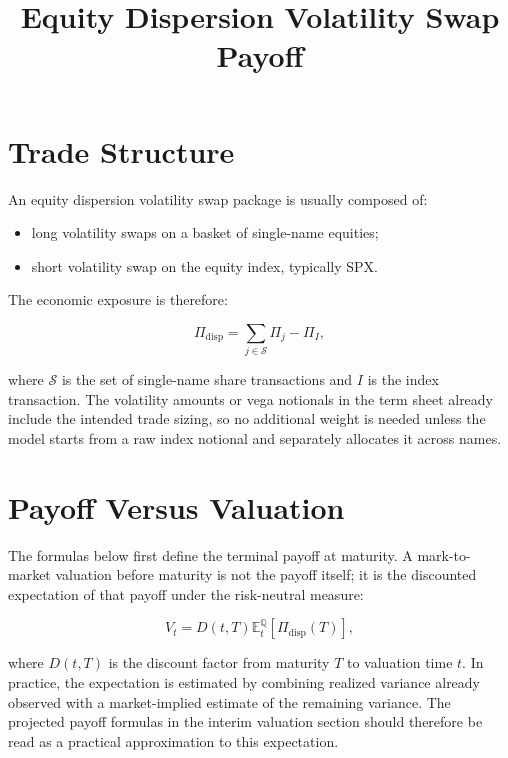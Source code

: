 \documentclass[11pt]{article}
\title{Equity Dispersion Volatility Swap Payoff}
\author{}
\date{}
\begin{document}
\maketitle

\section{Trade Structure}

An equity dispersion volatility swap package is usually composed of:

\begin{itemize}[leftmargin=*]
    \item long volatility swaps on a basket of single-name equities;
    \item short volatility swap on the equity index, typically SPX.
\end{itemize}

The economic exposure is therefore:

\begin{equation}
    \Pi_{\mathrm{disp}}
    =
    \sum_{j \in \mathcal{S}} \Pi_j
    -
    \Pi_I ,
\end{equation}

where $\mathcal{S}$ is the set of single-name share transactions and $I$ is the index transaction. The volatility amounts or vega notionals in the term sheet already include the intended trade sizing, so no additional weight is needed unless the model starts from a raw index notional and separately allocates it across names.

\section{Payoff Versus Valuation}

The formulas below first define the terminal payoff at maturity. A mark-to-market valuation before maturity is not the payoff itself; it is the discounted expectation of that payoff under the risk-neutral measure:

\begin{equation}
    V_t
    =
    D(t,T)
    \mathbb{E}_t^{\mathbb{Q}}
    \left[
        \Pi_{\mathrm{disp}}(T)
    \right],
\end{equation}

where $D(t,T)$ is the discount factor from maturity $T$ to valuation time $t$. In practice, the expectation is estimated by combining realized variance already observed with a market-implied estimate of the remaining variance. The projected payoff formulas in the interim valuation section should therefore be read as a practical approximation to this expectation.
\end{document}
